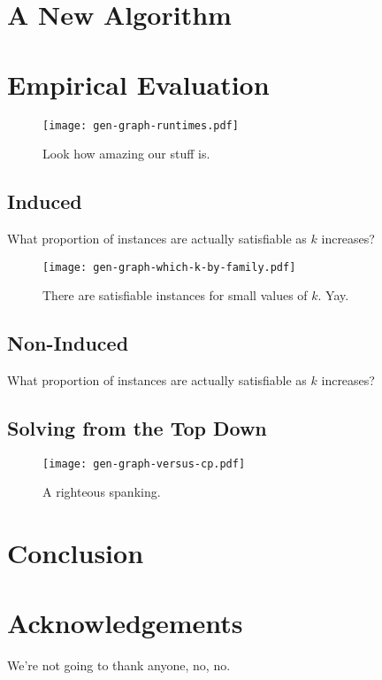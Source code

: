 \documentclass[letterpaper]{article}
\theoremstyle{definition}
\begin{document}
\section{A New Algorithm}

\section{Empirical Evaluation}

\begin{figure}
    \texttt{[image: gen-graph-runtimes.pdf]}
    \caption{Look how amazing our stuff is.}\label{figure:runtimes}
\end{figure}

\subsection{Induced}

What proportion of instances are actually satisfiable as $k$ increases?

\begin{figure}
    \texttt{[image: gen-graph-which-k-by-family.pdf]}
    \caption{There are satisfiable instances for small values of $k$. Yay.}\label{figure:which-k}
\end{figure}

\subsection{Non-Induced}

What proportion of instances are actually satisfiable as $k$ increases?

\subsection{Solving from the Top Down}

\begin{figure}
    \texttt{[image: gen-graph-versus-cp.pdf]}
    \caption{A righteous spanking.}\label{figure:versus-cp}
\end{figure}

\section{Conclusion}

\section*{Acknowledgements}

We're not going to thank anyone, no, no.



\end{document}
